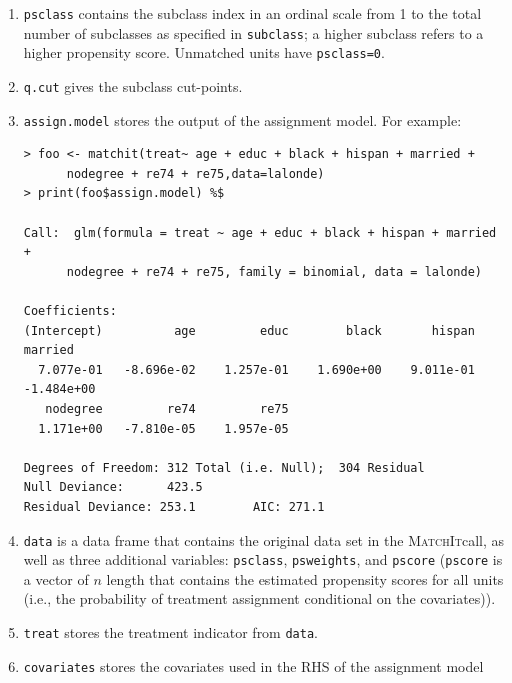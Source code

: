 \documentclass[oneside,letterpaper,titlepage]{article}
\newcommand{\MatchIt}{\textsc{MatchIt}}
\begin{document}
\begin{enumerate}
\item \texttt{psclass} contains the subclass index in an ordinal scale
  from 1 to the total number of subclasses as specified in
  \texttt{subclass}; a higher subclass refers to a higher propensity
  score.  Unmatched units have \texttt{psclass=0}.

\item \texttt{q.cut} gives the subclass cut-points.  

\item \texttt{assign.model} stores the output of the assignment
  model.  For example: 
  
  \begin{footnotesize}
\begin{verbatim}
> foo <- matchit(treat~ age + educ + black + hispan + married +
      nodegree + re74 + re75,data=lalonde)
> print(foo$assign.model) %$

Call:  glm(formula = treat ~ age + educ + black + hispan + married +
      nodegree + re74 + re75, family = binomial, data = lalonde) 

Coefficients:
(Intercept)          age         educ        black       hispan      married  
  7.077e-01   -8.696e-02    1.257e-01    1.690e+00    9.011e-01   -1.484e+00  
   nodegree         re74         re75  
  1.171e+00   -7.810e-05    1.957e-05  

Degrees of Freedom: 312 Total (i.e. Null);  304 Residual
Null Deviance:      423.5 
Residual Deviance: 253.1        AIC: 271.1 
\end{verbatim}
\end{footnotesize}

\item \texttt{data} is a data frame that contains the original data set in the \MatchIt call, as well as three additional variables: \texttt{psclass}, 
\texttt{psweights}, and \texttt{pscore} (\texttt{pscore} is a vector of $n$ length that contains the estimated propensity scores for
  all units (i.e., the probability of treatment assignment
  conditional on the covariates)).

\item \texttt{treat} stores the treatment indicator from \texttt{data}.

\item \texttt{covariates} stores the covariates used in the RHS of the
  assignment model
\end{enumerate}
\end{document}
